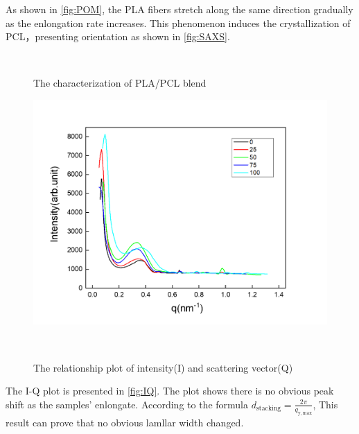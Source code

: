 \documentclass[a4paper,sans]{article}
\begin{document}
		As shown in \autoref{fig:POM}, the PLA fibers stretch along the same direction gradually as the enlongation rate increases. This phenomenon induces the crystallization of PCL，presenting orientation as shown in \autoref{fig:SAXS}.
	\begin{figure}[ht]
		\centering
		\caption{The characterization of PLA/PCL blend} ~\label{fig:microstructure}
	\end{figure}
	\begin{figure}[ht]
		\centering
		\includegraphics[scale = 0.32]{figures/IQ.png}
		\caption{The relationship plot of intensity(I) and scattering vector(Q)} ~\label{fig:IQ}
	\end{figure}
	The I-Q plot is presented in \autoref{fig:IQ}. The plot shows there is no obvious peak shift as the samples' enlongate. According to the formula $d_{\mathrm{stacking}}=\frac{2\pi}{q_{\mathrm{y,max}}}$, This result can prove that 
	no obvious lamllar width changed.
\end{document}
